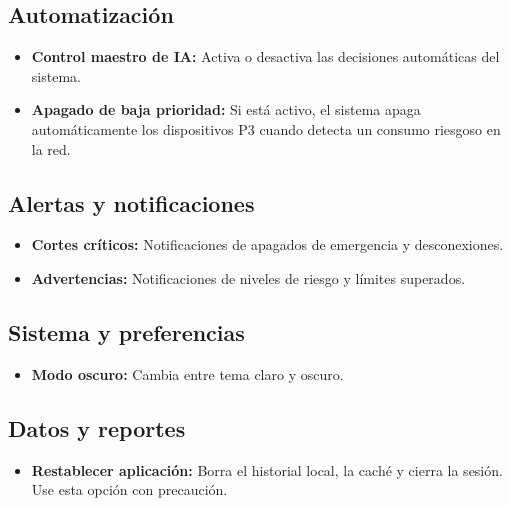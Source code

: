 \documentclass[10pt,a4paper]{article}
\begin{document}
\subsection{Automatización}
\begin{itemize}
    \item \textbf{Control maestro de IA:} Activa o desactiva las decisiones automáticas del sistema.
    \item \textbf{Apagado de baja prioridad:} Si está activo, el sistema apaga automáticamente los dispositivos P3 cuando detecta un consumo riesgoso en la red.
\end{itemize}

\subsection{Alertas y notificaciones}
\begin{itemize}
    \item \textbf{Cortes críticos:} Notificaciones de apagados de emergencia y desconexiones.
    \item \textbf{Advertencias:} Notificaciones de niveles de riesgo y límites superados.
\end{itemize}

\subsection{Sistema y preferencias}
\begin{itemize}
    \item \textbf{Modo oscuro:} Cambia entre tema claro y oscuro.
\end{itemize}

\subsection{Datos y reportes}
\begin{itemize}
    \item \textbf{Restablecer aplicación:} Borra el historial local, la caché y cierra la sesión. Use esta opción con precaución.
\end{itemize}
\end{document}
